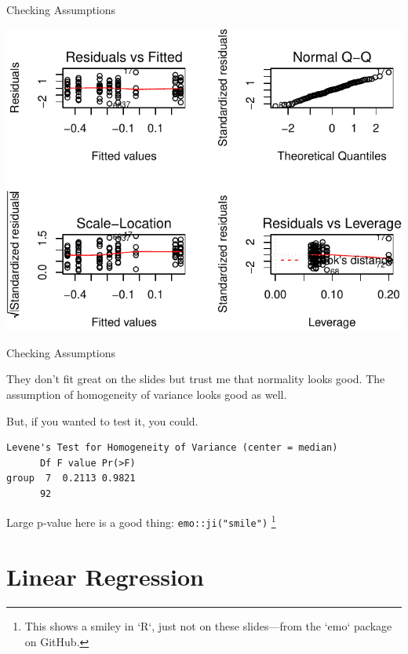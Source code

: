 \begin{frame}{Checking Assumptions}

\includegraphics{04_BasicAnalyses_files/figure-beamer/unnamed-chunk-17-1.pdf}

\end{frame}

\begin{frame}[fragile]{Checking Assumptions}

They don't fit great on the slides but trust me that normality looks
good. The assumption of homogeneity of variance looks good as well.

But, if you wanted to test it, you could.

\begin{Shaded}
\begin{Highlighting}[]
\end{Highlighting}
\end{Shaded}

\begin{verbatim}
Levene's Test for Homogeneity of Variance (center = median)
      Df F value Pr(>F)
group  7  0.2113 0.9821
      92               
\end{verbatim}

Large p-value here is a good thing: \texttt{emo::ji("smile")}
\footnote{This shows a smiley in `R`, just not on these slides---from the `emo` package on GitHub.}

\end{frame}

\section{Linear Regression}\label{linear-regression}

